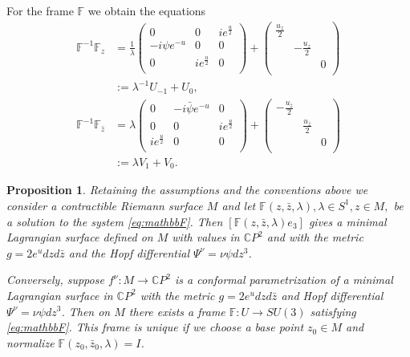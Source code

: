 \documentclass[a4paper,11pt]{amsart}
\newtheorem{proposition}[theorem]{Proposition}
\theoremstyle{definition}
\numberwithin{equation}{section}
\newcommand{\F}{\mathbb{F}}
\begin{document}
For the frame  $\mathbb{F}$ we obtain the equations
\begin{equation}\label{eq:mathbbF}
\begin{split}
\mathbb{F}^{-1}\mathbb{F}_z&=
\frac{1}{\lambda}\left(
   \begin{array}{ccc}
     0 & 0 & i e^{\frac{u}{2}} \\
  -i \psi e^{-u}   & 0 & 0 \\
     0 &  i e^{\frac{u}{2}} & 0 \\
   \end{array}
 \right)+\left(
   \begin{array}{ccc}
   \frac{u_z}{2}  & &  \\
      & -\frac{u_z}{2} &  \\
      & & 0 \\
   \end{array}
 \right)\\
 &:=\lambda^{-1}U_{-1}+U_0,\\
\mathbb{F}^{-1}\mathbb{F}_{\bar{z}} &=\lambda \left(
   \begin{array}{ccc}
     0 &  -i\bar{\psi} e^{-u} & 0 \\
     0& 0   & i e^{\frac{u}{2}} \\
     i e^{\frac{u}{2}} &0 & 0 \\
   \end{array}
 \right)+\left(
   \begin{array}{ccc}
     -\frac{u_{\bar z}}{2} & &  \\
      & \frac{u_{\bar z}}{2}  & \\
     & & 0 \\
   \end{array}
 \right)\\
  &:=\lambda V_{1}+V_0.
\end{split}
\end{equation}

\begin{proposition}\label{prop:frame} \cite{MM, DoKoMa}
 Retaining the assumptions and the conventions above we consider a contractible Riemann surface $M $ and let $\mathbb{F}(z, \bar{z},\lambda),  \lambda\in S^1, z \in M, $ be a solution to the system \eqref{eq:mathbbF}.
Then $[\mathbb{F}(z, \bar{z}, \lambda)e_3]$ gives a minimal Lagrangian surface defined on $M$ with values in $\mathbb{C}P^2$ and 
with the metric $g=2e^{u}dzd\bar{z}$ and the Hopf differential $\Psi^{\nu}=\nu \psi dz^3$.

Conversely, suppose $f^{\nu}:M\rightarrow \mathbb{C}P^2$ is a conformal parametrization of
a minimal Lagrangian surface in $\mathbb{C}P^2$ with the metric $g=2e^{u}dzd\bar{z}$ and Hopf differential
$\Psi^{\nu}=\nu\psi dz^3$.  Then  on $M$ there exists  a  frame $\mathbb{F}: U \rightarrow SU(3)$
satisfying \eqref{eq:mathbbF}. This frame is unique if we choose a base point $z_0 \in M$ and normalize  $\F(z_0, \bar{z}_0,\lambda) = I$.
\end{proposition}
\end{document}
